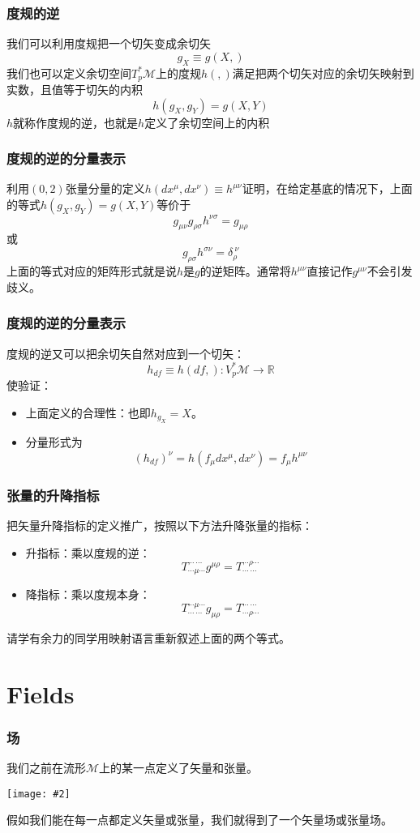 \documentclass[CJK]{beamer}
\newcommand{\reals}{\mathbb{R}}
\newcommand{\mani}{\mathcal{M}}
\newcommand{\cpic}[2]{
\begin{center}
\texttt{[image: \#2]}
\end{center}
}
\begin{document}
\begin{frame}
\frametitle{\bch 度规的逆 \ech}
\bch
我们可以利用度规把一个切矢变成余切矢
$$g_X \equiv g(X,)$$
我们也可以定义余切空间$T_p^*\mani$上的度规$h(,)$满足把两个切矢对应的余切矢映射到实数，且值等于切矢的内积
$$
h(g_X,g_Y) = g(X,Y)
$$
$h$就称作度规的逆，也就是$h$定义了余切空间上的内积
\ech
\end{frame}

\begin{frame}
\frametitle{\bch 度规的逆的分量表示 \ech}
\bch
利用$(0,2)$张量分量的定义$h(dx^\mu,dx^\nu) \equiv h^{\mu \nu}$证明，在给定基底的情况下，上面的等式$h(g_X,g_Y) = g(X,Y)$等价于
$$
g_{\mu \nu} g_{\rho \sigma} h^{\nu \sigma} = g_{\mu \rho}
$$
或
$$g_{\rho \sigma} h^{\sigma \nu} = \delta_\rho^{\ \nu}
$$
上面的等式对应的矩阵形式就是说$h$是$g$的逆矩阵。通常将$h^{\mu \nu}$直接记作$g^{\mu \nu}$不会引发歧义。
\ech
\end{frame}

\begin{frame}
\frametitle{\bch 度规的逆的分量表示 \ech}
\bch
度规的逆又可以把余切矢自然对应到一个切矢：
$$
h_{df} \equiv h(df,) : V_p^* \mani \to \reals
$$
使验证：
\begin{itemize}
\item
上面定义的合理性：也即$h_{g_X} = X$。
\item
分量形式为
$$
(h_{df})^\nu = h(f_\mu dx^\mu,dx^\nu) = f_\mu h^{\mu \nu}
$$
\end{itemize}
\ech
\end{frame}

\begin{frame}
\frametitle{\bch 张量的升降指标 \ech}
\bch
把矢量升降指标的定义推广，按照以下方法升降张量的指标：
\begin{itemize}
\item 升指标：乘以度规的逆：
$$T_{\cdots \mu \cdots}^{\cdots\ \cdots}  g^{\mu \rho} = T_{\cdots\ \cdots}^{\cdots \rho \cdots}$$
\item 降指标：乘以度规本身：
$$T_{\cdots\ \cdots}^{\cdots \mu \cdots} g_{\mu \rho} = T_{\cdots \rho \cdots}^{\cdots\ \cdots}$$
\end{itemize}
请学有余力的同学用映射语言重新叙述上面的两个等式。
\ech
\end{frame}

\section{Fields}
\begin{frame}
\frametitle{\bch 场 \ech}
\bch
我们之前在流形$\mani$上的某一点定义了矢量和张量。
\cpic{0.2}{good}
假如我们能在每一点都定义矢量或张量，我们就得到了一个矢量场或张量场。
\ech
\end{frame}
\end{document}
